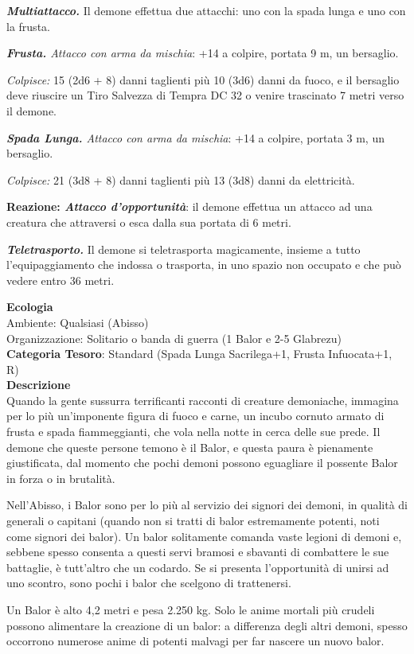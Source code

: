 \begin{multicols}{2}
{\emph{\textbf{Multiattacco.}} Il demone effettua due attacchi: uno con la spada lunga e uno con la frusta.

\emph{\textbf{Frusta.} Attacco con arma da mischia}: +14 a colpire, portata 9 m, un bersaglio.

\emph{Colpisce:} 15 (2d6 + 8) danni taglienti più 10 (3d6) danni da fuoco, e il bersaglio deve riuscire un Tiro Salvezza di Tempra DC 32 o venire trascinato 7 metri verso il demone.

\emph{\textbf{Spada Lunga.} Attacco con arma da mischia}: +14 a colpire, portata 3 m, un bersaglio.

\emph{Colpisce:} 21 (3d8 + 8) danni taglienti più 13 (3d8) danni da elettricità.

\textbf{Reazione: \emph{Attacco d'opportunità}}: il demone effettua un attacco ad una creatura che attraversi o esca dalla sua portata di 6 metri.

\emph{\textbf{Teletrasporto.}} Il demone si teletrasporta magicamente, insieme a tutto l'equipaggiamento che indossa o trasporta, in uno spazio non occupato e che può vedere entro 36 metri.

\textbf{Ecologia}\\
Ambiente: Qualsiasi (Abisso)\\
Organizzazione: Solitario o banda di guerra (1 Balor e 2-5 Glabrezu)\\
\textbf{Categoria Tesoro}: Standard (Spada Lunga Sacrilega+1, Frusta Infuocata+1, R)\\
\textbf{Descrizione}\\
Quando la gente sussurra terrificanti racconti di creature demoniache, immagina per lo più un'imponente figura di fuoco e carne, un incubo cornuto armato di frusta e spada fiammeggianti, che vola nella notte in cerca delle sue prede. Il demone che queste persone temono è il Balor, e questa paura è pienamente giustificata, dal momento che pochi demoni possono eguagliare il possente Balor in forza o in brutalità.

Nell'Abisso, i Balor sono per lo più al servizio dei signori dei demoni, in qualità di generali o capitani (quando non si tratti di balor estremamente potenti, noti come signori dei balor). Un balor solitamente comanda vaste legioni di demoni e, sebbene spesso consenta a questi servi bramosi e sbavanti di combattere le sue battaglie, è tutt'altro che un codardo. Se si presenta l'opportunità di unirsi ad uno scontro, sono pochi i balor che scelgono di trattenersi.

Un Balor è alto 4,2 metri e pesa 2.250 kg. Solo le anime mortali più crudeli possono alimentare la creazione di un balor: a differenza degli altri demoni, spesso occorrono numerose anime di potenti malvagi per far nascere un nuovo balor.

}
\end{multicols}
